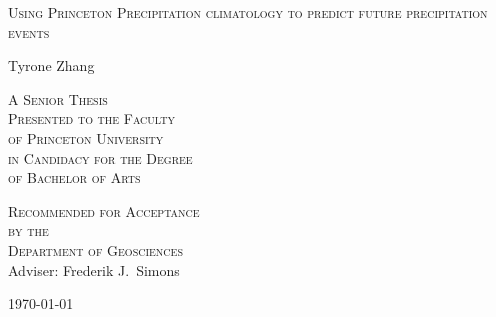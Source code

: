 \thispagestyle{empty}
  \begin{center}
    \textsc{\LARGE Using Princeton Precipitation climatology to predict future precipitation events} %
  \end{center}
  \vspace{.6in}
  \begin{center}
      Tyrone Zhang
  \end{center}
  \vspace{.6in}
  \begin{center}
    \textsc{A Senior Thesis \\ %
    Presented to the Faculty \\
    of Princeton University \\
    in Candidacy for the Degree \\
    of Bachelor of Arts}
  \end{center}
  \vspace{.3in}
  \begin{center}
    \textsc{Recommended for Acceptance \\
    by the \\Department of  Geosciences \\}
    Adviser: Frederik J.~Simons
  \end{center}
  \vspace{.3in}
  \begin{center}
  \today
  \end{center}
  
  \clearpage
